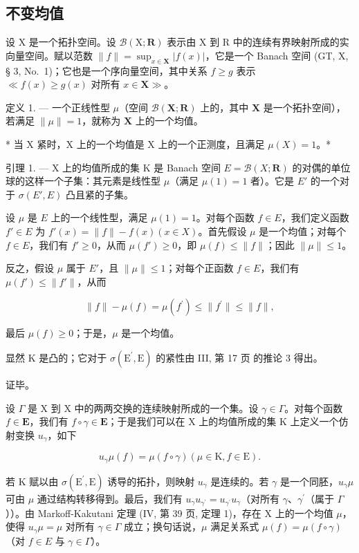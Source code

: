 \subsection{不变均值}

设 X 是一个拓扑空间。设 \(\mathcal{B}(\mathrm{X};\mathbf{R})\) 表示由 X 到 R 中的连续有界映射所成的实向量空间。赋以范数 \(\| f\| = \sup_{x\in \mathbf{X}}|f(x)|\)，它是一个 Banach 空间 (GT, X, § 3, No.~1)；它也是一个序向量空间，其中关系 \(f\geqslant g\) 表示 \(\ll f(x)\geqslant g(x) \text{ 对所有 } x\in \mathbf{X}\gg\)。

定义 1. --- 一个正线性型 \(\mu\)（空间 \(\mathcal{B}(\mathbf{X};\mathbf{R})\) 上的，其中 \(\mathbf{X}\) 是一个拓扑空间），若满足 \(\|\mu\| = 1\)，就称为 \(\mathbf{X}\) 上的一个均值。

* 当 X 紧时，X 上的一个均值是 X 上的一个正测度，且满足 \(\mu(X)=1\)。*

引理 1. --- X 上的均值所成的集 K 是 Banach 空间 \(E = \mathcal{B}(X; \mathbf{R})\) 的对偶的单位球的这样一个子集：其元素是线性型 \(\mu\)（满足 \(\mu(1)=1\) 者）。它是 \(E'\) 的一个对于 \(\sigma(E', E)\) 凸且紧的子集。

设 \(\mu\) 是 \(E\) 上的一个线性型，满足 \(\mu(1) = 1\)。对每个函数 \(f \in E\)，我们定义函数 \(f' \in E\) 为 \(f'(x) = \| f \| - f(x) (x \in X)\)。首先假设 \(\mu\) 是一个均值；对每个 \(f \in E\)，我们有 \(f' \geqslant 0\)，从而 \(\mu(f') \geqslant 0\)，即 \(\mu(f) \leqslant \| f \|\)；因此 \(\|\mu\| \leqslant 1\)。

反之，假设 \(\mu\) 属于 \(E'\)，且 \(\| \mu \| \leqslant 1\)；对每个正函数 \(f \in E\)，我们有 \(\mu(f') \leqslant \| f'\|\)，从而

\[
\| f \| - \mu (f) = \mu \left(f ^ {\prime}\right) \leqslant \| f ^ {\prime} \| \leqslant \| f \|,
\]

最后 \(\mu(f) \geqslant 0\)；于是，\(\mu\) 是一个均值。

显然 K 是凸的；它对于 \(\sigma(\mathrm{E}^{\prime},\mathrm{E})\) 的紧性由 III, 第 17 页 的推论 3 得出。

证毕。

设 \(\Gamma\) 是 X 到 X 中的两两交换的连续映射所成的一个集。设 \(\gamma \in \Gamma\)。对每个函数 \(f \in \mathbf{E}\)，我们有 \(f \circ \gamma \in \mathbf{E}\)；于是我们可以在 X 上的均值所成的集 K 上定义一个仿射变换 \(u_{\gamma}\)，如下

\[
u _ {\gamma} \mu (f) = \mu (f \circ \gamma) (\mu \in \mathrm{K}, f \in \mathrm{E}).
\]

若 K 赋以由 \(\sigma(\mathrm{E}^{\prime},\mathrm{E})\) 诱导的拓扑，则映射 \(u_{\gamma}\) 是连续的。若 \(\gamma\) 是一个同胚，\(u_{\gamma}\mu\) 可由 \(\mu\) 通过结构转移得到。最后，我们有 \(u_{\gamma}u_{\gamma^{\prime}} = u_{\gamma^{\prime}}u_{\gamma}\)（对所有 \(\gamma\)、\(\gamma^{\prime}\)（属于 \(\Gamma\)））。由 Markoff-Kakutani 定理 (IV, 第 39 页, 定理 1)，存在 X 上的一个均值 \(\mu\)，使得 \(u_{\gamma}\mu = \mu\) 对所有 \(\gamma \in \Gamma\) 成立；换句话说，\(\mu\) 满足关系式 \(\mu(f) = \mu(f \circ \gamma)\)（对 \(f \in E\) 与 \(\gamma \in \Gamma\)）。

